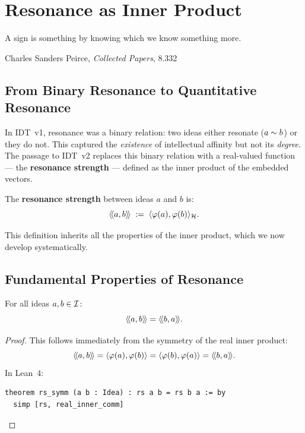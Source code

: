 \chapter{Resonance as Inner Product}
\label{ch:resonance}

\epigraph{A sign is something by knowing which we know something more.}{Charles Sanders Peirce, \textit{Collected Papers}, 8.332}

\section{From Binary Resonance to Quantitative Resonance}

In IDT~v1, resonance was a binary relation: two ideas either resonate ($a \sim
b$) or they do not. This captured the \emph{existence} of intellectual affinity
but not its \emph{degree}. The passage to IDT~v2 replaces this binary relation
with a real-valued function --- the \textbf{resonance strength} --- defined as
the inner product of the embedded vectors.

\begin{definition}
\label{def:resonance-strength}
The \textbf{resonance strength} between ideas $a$ and $b$ is:
\[
  \langle\!\langle a, b \rangle\!\rangle \;:=\; \langle \varphi(a), \varphi(b) \rangle_{\mathcal{H}}.
\]
\end{definition}

This definition inherits all the properties of the inner product, which we now
develop systematically.


\section{Fundamental Properties of Resonance}

\begin{theorem}
\label{thm:resonance-symmetry}
For all ideas $a, b \in \mathcal{I}$:
\[
  \langle\!\langle a, b \rangle\!\rangle = \langle\!\langle b, a \rangle\!\rangle.
\]
\end{theorem}

\begin{proof}
This follows immediately from the symmetry of the real inner product:
\[
  \langle\!\langle a, b \rangle\!\rangle = \langle \varphi(a), \varphi(b) \rangle = \langle \varphi(b), \varphi(a) \rangle = \langle\!\langle b, a \rangle\!\rangle.
\]
In Lean~4:
\begin{lstlisting}
theorem rs_symm (a b : Idea) : rs a b = rs b a := by
  simp [rs, real_inner_comm]
\end{lstlisting}
\end{proof}

